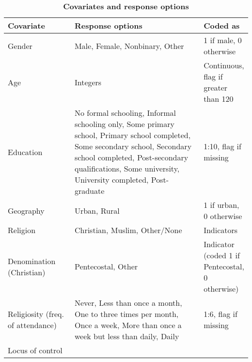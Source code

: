 \begin{table}[H]
\caption{\textbf{Covariates and response options}}
\label{tab:cov_long}
\begin{adjustbox}{totalheight=.9\baselineskip, max width = \textwidth}
\begin{tabular}{p{0.3\linewidth}p{0.7\linewidth}p{0.25\linewidth}}
\textbf{Covariate}                   & \textbf{Response options} & \textbf{Coded as}                                     \\
\hline
Gender                                      & Male,   Female, Nonbinary, Other                           & 1 if male, 0 otherwise  \\
Age                                         & Integers                                                   & Continuous, {flag if greater than 120}              \\
Education &
  No   formal schooling, Informal schooling only, Some primary school, Primary   school completed, Some secondary school, Secondary school completed,   Post-secondary qualifications, Some university, University completed,   Post-graduate &
  1:10, flag if missing \\
Geography                                   & Urban, Rural                                 & 1 if urban, 0 otherwise \\
Religion                                    & Christian, Muslim, Other/None                           & Indicators              \\
Denomination (Christian)  & Pentecostal, Other  & Indicator (coded 1 if Pentecostal, 0 otherwise)\\
Religiosity   (freq. of attendance) &
  Never,   Less than once a month, One to three times per month, Once a week, More than   once a week but less than daily, Daily &
  1:6, flag if missing \\
 Locus of control & 

\end{tabular}
\end{adjustbox}
\end{table}
